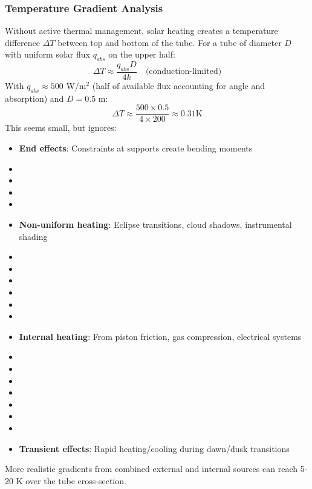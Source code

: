 {{{{\subsubsection{Temperature Gradient Analysis}
Without active thermal management, solar heating creates a temperature difference $\Delta T$ between top and bottom of the tube. For a tube of diameter $D$ with uniform solar flux $q_{abs}$ on the upper half:
\begin{equation}
\Delta T \approx \frac{q_{abs} D}{4k} \quad \text{(conduction-limited)}
\end{equation}
With $q_{abs} \approx 500$ W/m$^2$ (half of available flux accounting for angle and absorption) and $D = 0.5$ m:
\begin{equation}
\Delta T \approx \frac{500 \times 0.5}{4 \times 200} \approx 0.31  \text{K}
\end{equation}
This seems small, but ignores:
\begin{itemize}
    \item \textbf{End effects}: Constraints at supports create bending moments
    \item \item \item \item \item \textbf{Non-uniform heating}: Eclipse transitions, cloud shadows, instrumental shading
    \item \item \item \item \item \item \item \textbf{Internal heating}: From piston friction, gas compression, electrical systems
    \item \item \item \item \item \item \item \item \textbf{Transient effects}: Rapid heating/cooling during dawn/dusk transitions
\end{itemize}
More realistic gradients from combined external and internal sources can reach 5-20 K over the tube cross-section.

}}}}
